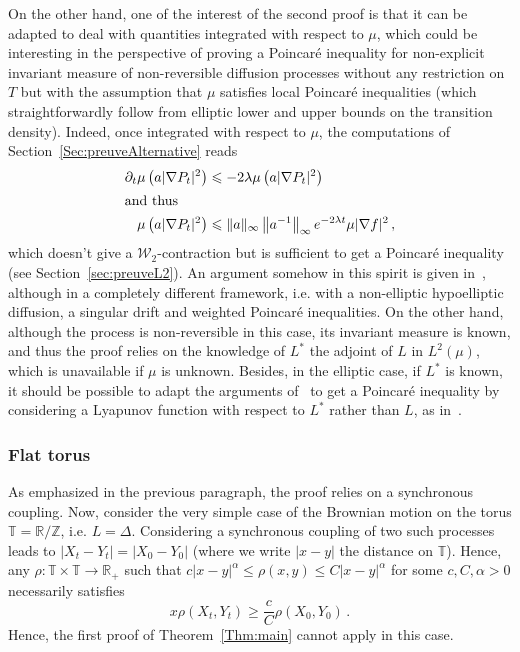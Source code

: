 \documentclass[AHL,Unicode,longabstracts,published]{cedram}
\newcommand{\R}{\mathbb R}
\newcommand{\T}{\mathbb T}
\newcommand{\Z}{\mathbb Z}
\newcommand{\clW}{\mathcal W}
\newcommand{\na}{\nabla}
\newcommand{\1}{\mathbbm{1}}
\newcommand{\R}{\mathbb R}
\newcommand{\clW}{\mathcal W}
\begin{document}
On the other hand, one of the interest of the second proof is that it can be adapted to deal with quantities integrated with respect to $\mu$, which could be interesting in the perspective of proving a Poincaré inequality for non-explicit invariant measure of non-reversible diffusion processes without any restriction on $T$ but with the assumption that $\mu$ satisfies local Poincaré inequalities (which straightforwardly follow from elliptic lower and upper bounds on the transition density). Indeed, once integrated with respect to $\mu$, the computations of Section~\ref{Sec:preuveAlternative} reads
\begin{align*}
\partial_t \mu\left( a |\na P_t|^2\right) &\leqslant -2\lambda \mu\left( a |\na P_t|^2\right)
\\
\intertext{and thus}
\mu\left(a|\na P_t|^2\right) &\leqslant \|a\|_\infty \left\|a^{-1}\right\|_\infty e^{-2\lambda t} \mu|\na f|^2\,,
\end{align*}
which doesn't give a $\clW_2$-contraction but is sufficient to get a Poincaré inequality (see Section~\ref{sec:preuveL2}). An argument somehow in this spirit is given in~\cite{BaudoinGordinaHerzog}, although in a completely different framework, i.e. with a non-elliptic hypoelliptic diffusion, a singular drift and weighted Poincaré inequalities. On the other hand, although the process is non-reversible in this case, its invariant measure is known, and thus the proof relies on the knowledge of $L^*$ the adjoint of $L$ in $L^2(\mu)$, which is unavailable if $\mu$ is unknown. Besides, in the elliptic case, if $L^*$ is known, it should be possible to adapt the arguments of~\cite{BakryCattiauxGuillin,CattiauxGuillin} to get a Poincaré inequality by considering a Lyapunov function with respect to $L^*$ rather than $L$, as in~\cite{BaudoinGordinaHerzog}.



\subsubsection*{Flat torus}

As emphasized in the previous paragraph, the proof relies on a synchronous coupling. Now, consider the very simple case of the Brownian motion on the torus $\T = \R/\Z$, i.e. $L=\Delta$. Considering a synchronous coupling of two such processes leads to $|X_t-Y_t|=|X_0-Y_0|$ (where we write $|x-y|$ the distance on $\T$). Hence, any $\rho:\T\times\T\rightarrow \R_+$ such that $c|x-y|^\alpha \leqslant \rho(x,y)\leqslant C|x-y|^\alpha$ for some $c,C,\alpha>0$ necessarily satisfies
\[x
\rho(X_t,Y_t) \geqslant \frac{c}{C}\rho(X_0,Y_0)\,.
\]
Hence, the first proof of Theorem~\ref{Thm:main} cannot apply in this case.
\end{document}
